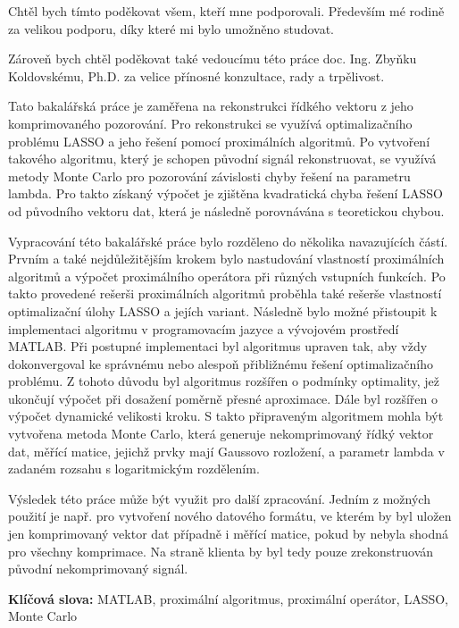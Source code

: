 \documentclass[FM,BP]{tulthesis}
\begin{document}
\begin{acknowledgement}
Chtěl bych tímto poděkovat všem, kteří mne podporovali. Především mé rodině za velikou podporu, díky které mi bylo umožněno studovat. 


Zároveň bych chtěl poděkovat také vedoucímu této práce doc. Ing. Zbyňku Koldovskému, Ph.D. za velice přínosné konzultace, rady a trpělivost.
\end{acknowledgement}
\clearpage
\begin{abstractCZ}
Tato bakalářská práce je zaměřena na rekonstrukci řídkého vektoru z jeho komprimovaného pozorování. Pro rekonstrukci se využívá optimalizačního problému LASSO a jeho řešení pomocí proximálních algoritmů. Po vytvoření takového algoritmu, který je schopen původní signál rekonstruovat, se využívá metody Monte Carlo pro pozorování závislosti chyby řešení na parametru lambda. Pro takto získaný výpočet je zjištěna kvadratická chyba řešení LASSO od původního vektoru dat, která je následně porovnávána s teoretickou chybou.


Vypracování této bakalářské práce bylo rozděleno do několika navazujících částí. Prvním a také nejdůležitějším krokem bylo nastudování vlastností proximálních algoritmů a výpočet proximálního operátora při různých vstupních funkcích. Po takto provedené rešerši proximálních algoritmů proběhla také rešerše vlastností optimalizační úlohy LASSO a jejích variant. Následně bylo možné přistoupit k implementaci algoritmu v programovacím jazyce a vývojovém prostředí MATLAB. Při postupné implementaci byl algoritmus upraven tak, aby vždy dokonvergoval ke správnému nebo alespoň přibližnému řešení optimalizačního problému. Z tohoto důvodu byl algoritmus rozšířen o podmínky optimality, jež ukončují výpočet při dosažení poměrně přesné aproximace. Dále byl rozšířen o výpočet dynamické velikosti kroku. S takto připraveným algoritmem mohla být vytvořena metoda Monte Carlo, která generuje nekomprimovaný řídký vektor dat, měřící matice, jejichž prvky mají Gaussovo rozložení, a parametr lambda v zadaném rozsahu s logaritmickým rozdělením.    


Výsledek této práce může být využit pro další zpracování. Jedním z možných použití je např. pro vytvoření nového datového formátu, ve kterém by byl uložen jen komprimovaný vektor dat případně i měřící matice, pokud by nebyla shodná pro všechny komprimace. Na straně klienta by byl tedy pouze zrekonstruován původní nekomprimovaný signál.


\textbf{Klíčová slova:} MATLAB, proximální algoritmus, proximální operátor, LASSO, Monte Carlo
\end{abstractCZ}
\end{document}
